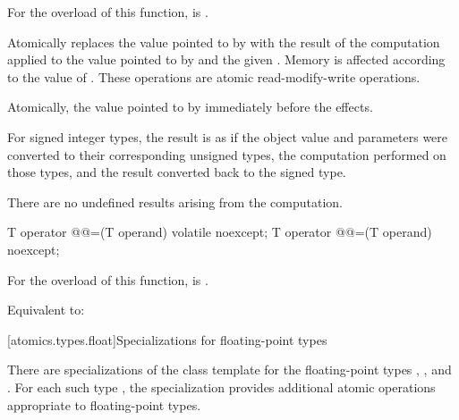 \begin{itemdescr}
\pnum
\constraints
For the  overload of this function,
 is .

\pnum
\effects
Atomically replaces the value pointed to by
 with the result of the computation applied to the
value pointed to by  and the given .
Memory is affected according to the value of .
These operations are atomic read-modify-write operations.

\pnum
\returns
Atomically, the value pointed to by  immediately before the effects.

\pnum
{}%
\remarks
For signed integer types,
the result is as if the object value and parameters
were converted to their corresponding unsigned types,
the computation performed on those types, and
the result converted back to the signed type.
\begin{note}
There are no undefined results arising from the computation.
\end{note}
\end{itemdescr}

%
%
%
%
%
%
%
\begin{itemdecl}
T operator @@=(T operand) volatile noexcept;
T operator @@=(T operand) noexcept;
\end{itemdecl}

\begin{itemdescr}
\pnum
\constraints
For the  overload of this function,
 is .

\pnum
\effects
Equivalent to: 
\end{itemdescr}

[atomics.types.float]{Specializations for floating-point types}

%
\pnum
There are specializations of the 
class template for the floating-point types
,
, and
.
For each such type ,
the specialization 
provides additional atomic operations appropriate to floating-point types.

